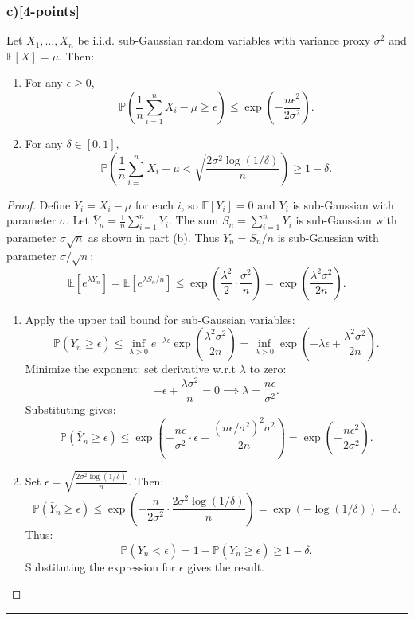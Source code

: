 \documentclass[12pt]{article}
\begin{document}
{{\subsubsection{c)[4-points]}
Let \(X_1, \ldots, X_n\) be i.i.d. sub-Gaussian random variables with variance proxy \(\sigma^2\) and \(\mathbb{E}[X] = \mu\). Then:

\begin{enumerate}
    \item For any \(\epsilon \geq 0\),
    \[
    \mathbb{P} \left( \frac{1}{n} \sum_{i=1}^n X_i - \mu \geq \epsilon \right) \leq \exp\left(-\frac{n\epsilon^2}{2\sigma^2}\right).
    \]
    
    \item For any \(\delta \in [0, 1]\),
    \[
    \mathbb{P} \left( \frac{1}{n} \sum_{i=1}^n X_i - \mu < \sqrt{\frac{2\sigma^2 \log(1/\delta)}{n}} \right) \geq 1 - \delta.
    \]
\end{enumerate}

\begin{proof}
Define \(Y_i = X_i - \mu\) for each \(i\), so \(\mathbb{E}[Y_i] = 0\) and \(Y_i\) is sub-Gaussian with parameter \(\sigma\). Let \(\bar{Y}_n = \frac{1}{n} \sum_{i=1}^n Y_i\). The sum \(S_n = \sum_{i=1}^n Y_i\) is sub-Gaussian with parameter \(\sigma\sqrt{n}\) as shown in part (b). Thus \(\bar{Y}_n = S_n / n\) is sub-Gaussian with parameter \(\sigma/\sqrt{n}\):
\[
\mathbb{E}[e^{\lambda \bar{Y}_n}] = \mathbb{E}[e^{\lambda S_n / n}] \leq \exp\left( \frac{\lambda^2}{2} \cdot \frac{\sigma^2}{n} \right) = \exp\left( \frac{\lambda^2 \sigma^2}{2n} \right).
\]

\begin{enumerate}
    \item Apply the upper tail bound for sub-Gaussian variables:
    \[
    \mathbb{P} \left( \bar{Y}_n \geq \epsilon \right) \leq \inf_{\lambda > 0} e^{-\lambda \epsilon} \exp\left( \frac{\lambda^2 \sigma^2}{2n} \right) = \inf_{\lambda > 0} \exp\left( -\lambda \epsilon + \frac{\lambda^2 \sigma^2}{2n} \right).
    \]
    Minimize the exponent: set derivative w.r.t \(\lambda\) to zero:
    \[
    -\epsilon + \frac{\lambda \sigma^2}{n} = 0 \implies \lambda = \frac{n\epsilon}{\sigma^2}.
    \]
    Substituting gives:
    \[
    \mathbb{P} \left( \bar{Y}_n \geq \epsilon \right) \leq \exp\left( -\frac{n\epsilon}{\sigma^2} \cdot \epsilon + \frac{(n\epsilon/\sigma^2)^2 \sigma^2}{2n} \right) = \exp\left( -\frac{n\epsilon^2}{2\sigma^2} \right).
    \]
    
    \item Set \(\epsilon = \sqrt{\frac{2\sigma^2 \log(1/\delta)}{n}}\). Then:
    \[
    \mathbb{P} \left( \bar{Y}_n \geq \epsilon \right) \leq \exp\left( -\frac{n}{2\sigma^2} \cdot \frac{2\sigma^2 \log(1/\delta)}{n} \right) = \exp\left( -\log(1/\delta) \right) = \delta.
    \]
    Thus:
    \[
    \mathbb{P} \left( \bar{Y}_n < \epsilon \right) = 1 - \mathbb{P} \left( \bar{Y}_n \geq \epsilon \right) \geq 1 - \delta.
    \]
    Substituting the expression for \(\epsilon\) gives the result.
\end{enumerate}
\end{proof}


\noindent\rule{\textwidth}{0.2pt}
}}
\end{document}
